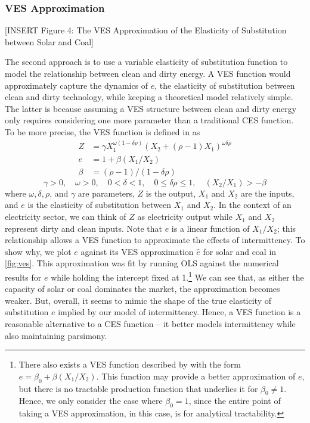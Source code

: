 \documentclass[11pt,a4paper,leqno]{extarticle}
\begin{document}
	\subsubsection{VES Approximation}
	\label{sec:VES}
	
	
	\vspace{0.15in}
	\begin{center}
		[INSERT Figure 4: The VES Approximation of the Elasticity of Substitution between Solar and Coal]
	\end{center}
	\vspace{0.15in}
	
	
	The second approach is to use a variable elasticity of substitution function to model the relationship between clean and dirty energy.  A VES function would approximately capture the dynamics of $e$, the elasticity of substitution between clean and dirty technology,  while keeping a theoretical model relatively simple. The latter is because assuming a VES structure between clean and dirty energy only requires considering one more parameter than a traditional CES function. To be more precise, the VES function is defined in \citet{VES} as
	\begin{align}
	Z &= \gamma X_1^{\omega(1-\delta \rho)} \left( X_2 + (\rho - 1) X_1 \right)^{\omega \delta \rho} \\
	e &= 1 + \beta (X_1 / X_2) \\
	\beta &= (\rho - 1) / ( 1- \delta \rho ) 
	\end{align}
	$$\gamma > 0, \quad \omega > 0, \quad0 < \delta < 1, \quad 0 \leq \delta \rho \leq 1 , \quad (X_2/X_1) >  -\beta $$
	where $\omega, \delta, \rho$, and $\gamma$ are parameters, $Z$ is the output, $X_1$ and $X_2$ are the inputs, and $e$ is the elasticity of substitution between $X_1$ and $X_2$. In the context of an electricity sector, we can think of $Z$ as electricity output while $X_1$ and $X_2$ represent dirty and clean inputs. Note that $e$ is a linear function of $X_1/X_2$; this relationship allows a VES function to approximate the effects of intermittency. To show why, we plot $e$ against its VES approximation $\hat{e}$ for solar and coal in \autoref{fig:ves}. This approximation was fit by running OLS against the numerical results for $e$ while holding the intercept fixed at 1.\footnote{ There also exists a VES function described by \citet{VES} with the form $e = \beta_0 + \beta (X_1/X_2)$. This function may provide a better approximation of $e$, but there is no tractable production function that underlies it for $\beta_0 \neq 1$. Hence, we only consider the case where $\beta_0 = 1$, since the entire point of taking a VES approximation, in this case, is for analytical tractability. } We can see that, as either the capacity of solar or coal dominates the market, the approximation becomes weaker. But, overall, it seems to mimic the shape of the true elasticity of substitution $e$ implied by our model of intermittency. Hence, a  VES function is a reasonable alternative to a CES function -- it better models intermittency while also maintaining parsimony. 
	
\end{document}

